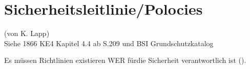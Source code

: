 \section*{Sicherheitsleitlinie/Polocies}
(von K. Lapp)\\

Siehe 1866 KE4 Kapitel 4.4 ab S.209 und BSI Grundschutzkatalog

Es müssen Richtlinien existieren WER fürdie Sicherheit verantwortlich ist (\cite{lipp2007vpn}).
